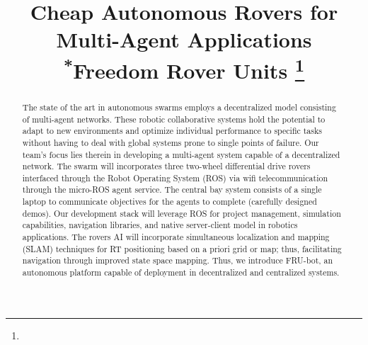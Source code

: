 \documentclass[conference]{IEEEtran}
\begin{document}
\begin{titlepage}
	\title{Cheap Autonomous Rovers for Multi-Agent Applications\\
		{\footnotesize \textsuperscript{*}Freedom Rover Units}
		\thanks{}}

	\author{
		\and
		\and
	}
	\maketitle
\end{titlepage}

\twocolumn

\begin{abstract}
The state of the art in autonomous swarms employs a decentralized model consisting of multi-agent networks. These robotic collaborative systems hold the potential to adapt to new environments and optimize individual performance to specific tasks without having to deal with global systems prone to single points of failure. Our team's focus lies therein in developing a multi-agent system capable of a decentralized network. The swarm will incorporates three two-wheel differential drive rovers interfaced through the Robot Operating System (ROS) via wifi telecommunication through the micro-ROS agent service. The central bay system consists of a single laptop to communicate objectives for the agents to complete (carefully designed demos). Our development stack will leverage ROS for project management, simulation capabilities, navigation libraries, and native server-client model in robotics applications. The rovers AI will incorporate simultaneous localization and mapping (SLAM) techniques for RT positioning based on a priori grid or map; thus, facilitating navigation through improved state space mapping. Thus, we introduce FRU-bot, an autonomous platform capable of deployment in decentralized and centralized systems.
\end{abstract}
\end{document}

